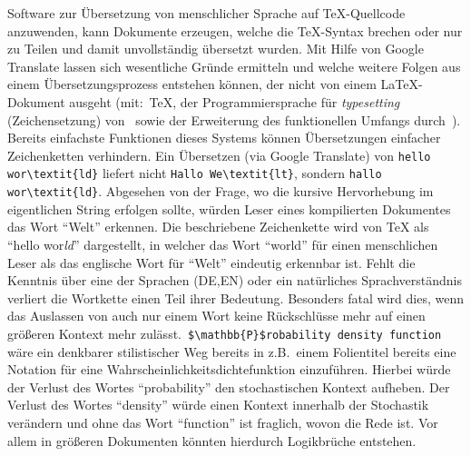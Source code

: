 Software zur Übersetzung von menschlicher Sprache auf \TeX{}-Quellcode anzuwenden, kann Dokumente erzeugen, welche die \TeX{}-Syntax brechen oder nur zu Teilen und damit unvollständig übersetzt wurden. 
Mit Hilfe von Google Translate lassen sich wesentliche Gründe ermitteln und welche weitere Folgen aus einem Übersetzungsprozess entstehen können, der nicht von einem \LaTeX{}-Dokument ausgeht (mit:\ \TeX{}, der Programmiersprache für \textit{typesetting} (Zeichensetzung) von~\cite{texbook} sowie der Erweiterung des funktionellen Umfangs durch~\cite{latexCompanion:leslieLamport}).
Bereits einfachste Funktionen dieses Systems können Übersetzungen einfacher Zeichenketten verhindern. Ein Übersetzen (via Google Translate) von \verb|hello wor\textit{ld}| liefert nicht \verb|Hallo We\textit{lt}|, sondern \verb|hallo wor\textit{ld}|. Abgesehen von der Frage, wo die kursive Hervorhebung im eigentlichen String erfolgen sollte, würden Leser eines kompilierten Dokumentes das Wort \enquote{Welt} erkennen.%
Die beschriebene Zeichenkette wird von \TeX{} als \enquote{hello wor\textit{ld}} dargestellt, in welcher das Wort \enquote{world} für einen menschlichen Leser als das englische Wort für \enquote{Welt} eindeutig erkennbar ist. Fehlt die Kenntnis über eine der Sprachen (DE,EN) oder ein natürliches Sprachverständnis verliert die Wortkette einen Teil ihrer Bedeutung.%
Besonders fatal wird dies, wenn das Auslassen von auch nur einem Wort keine Rückschlüsse mehr auf einen größeren Kontext mehr zulässt.\ \verb|$\mathbb{P}$robability density function| wäre ein denkbarer stilistischer Weg bereits in z.B.\ einem Folientitel bereits eine Notation für eine Wahrscheinlichkeitsdichtefunktion einzuführen. Hierbei würde der Verlust des Wortes \enquote{probability} den stochastischen Kontext aufheben. Der Verlust des Wortes \enquote{density} würde einen Kontext innerhalb der Stochastik verändern und ohne das Wort \enquote{function} ist fraglich, wovon die Rede ist. Vor allem in größeren Dokumenten könnten hierdurch Logikbrüche entstehen.%
\\\noindent

